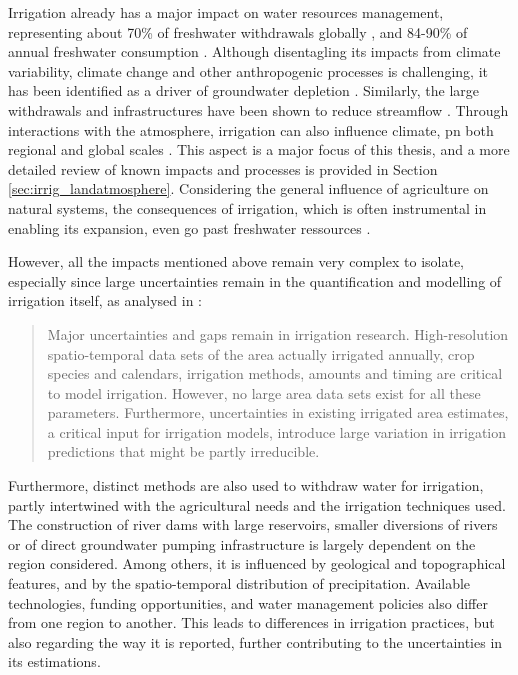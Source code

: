 Irrigation already has a major impact on water resources management, representing about 70\% of freshwater withdrawals globally , and 84-90\% of annual freshwater consumption \citep["withdrawn water that is evaporated, transpired, incorporated into products or crops, or consumed by humans or livestock", ][]{ mcdermid_irrigation_2023, qin_flexibility_2019}.
Although disentagling its impacts from climate variability, climate change and other anthropogenic processes is challenging, it has been identified as a driver of groundwater depletion \citep{siebert_groundwater_2010,thomas_identifying_2019,smith_estimating_2017}. 
Similarly, the large withdrawals and infrastructures have been shown to reduce streamflow \citep{vicente-serrano_climate_2019,biemans_impact_2011,pokhrel_recent_2016}. 
Through interactions with the atmosphere, irrigation can also influence climate,  pn both regional \citep{nocco_observation_2019} and global scales \citep{puma_effects_2010, cook_irrigation_2015,arboleda-obando_feedback_2023, arboleda-obando_joint_2025}. This aspect is a major focus of this thesis, and a more detailed review of known impacts and processes is provided in Section \ref{sec:irrig_landatmosphere}.
Considering the general influence of agriculture on natural systems, the consequences of irrigation, which is often instrumental in enabling its expansion, even go past freshwater ressources \citep{campbell2017agriculture}.

However, all the impacts mentioned above remain very complex to isolate, especially since large uncertainties remain in the quantification and modelling of irrigation itself, as analysed in \citet{mcdermid_irrigation_2023}:
\begin{quote}
    Major uncertainties and gaps remain in irrigation research. High-resolution spatio-temporal data sets of the area actually irrigated annually, crop species and calendars, irrigation methods, amounts and timing are critical to model irrigation. However, no large area data sets exist for all these parameters. Furthermore, uncertainties in existing irrigated area estimates, a critical input for irrigation models, introduce large variation in irrigation predictions that might be partly irreducible.
\end{quote}

Furthermore, distinct methods are also used to withdraw water for irrigation, partly intertwined with the agricultural needs and the irrigation techniques used. 
The construction of river dams with large reservoirs, smaller diversions of rivers or of direct groundwater pumping infrastructure is largely dependent on the region considered. 
Among others, it is influenced by geological and topographical features, and by the spatio-temporal distribution of precipitation. Available technologies, funding opportunities, and water management policies also differ from one region to another. This leads to differences in irrigation practices, but also regarding the way it is reported, further contributing to the uncertainties in its estimations.

